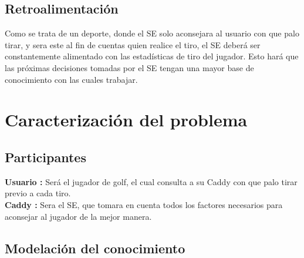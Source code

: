 \documentclass[runningheads,a4paper]{llncs}
\begin{document}
\subsection{Retroalimentación}

  Como se trata de un deporte, donde el SE solo aconsejara al usuario con que
  palo tirar, y sera este al fin de cuentas quien realice el tiro, el SE deberá
  ser constantemente alimentado con las estadísticas de tiro del jugador. Esto
  hará que las próximas decisiones tomadas por el SE tengan una mayor base de
  conocimiento con las cuales trabajar.\\
 
\section{Caracterización del problema}

\subsection{Participantes}

  \textbf{Usuario :} Será el jugador de golf, el cual consulta a su Caddy con
  que palo tirar previo a cada tiro.\\

  \textbf{Caddy :} Sera el SE, que tomara en cuenta todos los factores
  necesarios para aconsejar al jugador de la mejor manera.\\

\subsection{Modelación del conocimiento}
\end{document}
